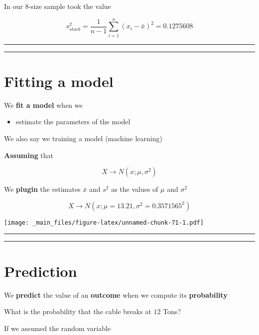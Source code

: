 \documentclass[
]{book}
\providecommand{\tightlist}{%
  \setlength{\itemsep}{0pt}\setlength{\parskip}{0pt}}
\begin{document}
In our \(8\)-size sample took the value

\[s_{stock}^2=\frac{1}{n-1}\sum_{i=1}^n (x_i-\bar{x})^2=0.1275608\]

\begin{center}\rule{0.5\linewidth}{0.5pt}\end{center}

\begin{center}\rule{0.5\linewidth}{0.5pt}\end{center}

\hypertarget{fitting-a-model}{%
\section{Fitting a model}\label{fitting-a-model}}

We \textbf{fit a model} when we

\begin{itemize}
\tightlist
\item
  estimate the parameters of the model
\end{itemize}

We also say we training a model (machine learning)

\textbf{Assuming} that

\[X \rightarrow N(x; \mu, \sigma^2)\]

We \textbf{plugin} the estimates \(\bar{x}\) and \(s^2\) as the values of \(\mu\)
and \(\sigma^2\)

\[X \rightarrow N(x; \mu=13.21, \sigma^2=0.3571565^2)\]

\texttt{[image: \_main\_files/figure-latex/unnamed-chunk-71-1.pdf]}

\begin{center}\rule{0.5\linewidth}{0.5pt}\end{center}

\begin{center}\rule{0.5\linewidth}{0.5pt}\end{center}

\hypertarget{prediction}{%
\section{Prediction}\label{prediction}}

We \textbf{predict} the value of an \textbf{outcome} when we compute its \textbf{probability}

What is the probability that the cable breaks at \(12\) Tons?

If we assumed the random variable
\end{document}
